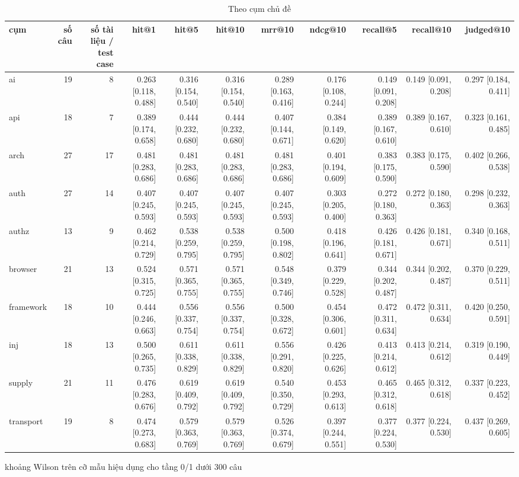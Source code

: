 \begin{table}[ht]
\centering
\caption{Theo cụm chủ đề}
\begin{tabular}{lrrrrrrrrrr}
\toprule
cụm & số câu & số tài liệu / test case & hit@1 & hit@5 & hit@10 & mrr@10 & ndcg@10 & recall@5 & recall@10 & judged@10 \\
\midrule
ai & 19 & 8 & 0.263 [0.118, 0.488] & 0.316 [0.154, 0.540] & 0.316 [0.154, 0.540] & 0.289 [0.163, 0.416] & 0.176 [0.108, 0.244] & 0.149 [0.091, 0.208] & 0.149 [0.091, 0.208] & 0.297 [0.184, 0.411] \\
api & 18 & 7 & 0.389 [0.174, 0.658] & 0.444 [0.232, 0.680] & 0.444 [0.232, 0.680] & 0.407 [0.144, 0.671] & 0.384 [0.149, 0.620] & 0.389 [0.167, 0.610] & 0.389 [0.167, 0.610] & 0.323 [0.161, 0.485] \\
arch & 27 & 17 & 0.481 [0.283, 0.686] & 0.481 [0.283, 0.686] & 0.481 [0.283, 0.686] & 0.481 [0.283, 0.686] & 0.401 [0.194, 0.609] & 0.383 [0.175, 0.590] & 0.383 [0.175, 0.590] & 0.402 [0.266, 0.538] \\
auth & 27 & 14 & 0.407 [0.245, 0.593] & 0.407 [0.245, 0.593] & 0.407 [0.245, 0.593] & 0.407 [0.245, 0.593] & 0.303 [0.205, 0.400] & 0.272 [0.180, 0.363] & 0.272 [0.180, 0.363] & 0.298 [0.232, 0.363] \\
authz & 13 & 9 & 0.462 [0.214, 0.729] & 0.538 [0.259, 0.795] & 0.538 [0.259, 0.795] & 0.500 [0.198, 0.802] & 0.418 [0.196, 0.641] & 0.426 [0.181, 0.671] & 0.426 [0.181, 0.671] & 0.340 [0.168, 0.511] \\
browser & 21 & 13 & 0.524 [0.315, 0.725] & 0.571 [0.365, 0.755] & 0.571 [0.365, 0.755] & 0.548 [0.349, 0.746] & 0.379 [0.229, 0.528] & 0.344 [0.202, 0.487] & 0.344 [0.202, 0.487] & 0.370 [0.229, 0.511] \\
framework & 18 & 10 & 0.444 [0.246, 0.663] & 0.556 [0.337, 0.754] & 0.556 [0.337, 0.754] & 0.500 [0.328, 0.672] & 0.454 [0.306, 0.601] & 0.472 [0.311, 0.634] & 0.472 [0.311, 0.634] & 0.420 [0.250, 0.591] \\
inj & 18 & 13 & 0.500 [0.265, 0.735] & 0.611 [0.338, 0.829] & 0.611 [0.338, 0.829] & 0.556 [0.291, 0.820] & 0.426 [0.225, 0.626] & 0.413 [0.214, 0.612] & 0.413 [0.214, 0.612] & 0.319 [0.190, 0.449] \\
supply & 21 & 11 & 0.476 [0.283, 0.676] & 0.619 [0.409, 0.792] & 0.619 [0.409, 0.792] & 0.540 [0.350, 0.729] & 0.453 [0.293, 0.613] & 0.465 [0.312, 0.618] & 0.465 [0.312, 0.618] & 0.337 [0.223, 0.452] \\
transport & 19 & 8 & 0.474 [0.273, 0.683] & 0.579 [0.363, 0.769] & 0.579 [0.363, 0.769] & 0.526 [0.374, 0.679] & 0.397 [0.244, 0.551] & 0.377 [0.224, 0.530] & 0.377 [0.224, 0.530] & 0.437 [0.269, 0.605] \\
\bottomrule
\end{tabular}
\par\smallskip\footnotesize khoảng Wilson trên cỡ mẫu hiệu dụng cho tầng 0/1 dưới 300 câu
\end{table}

